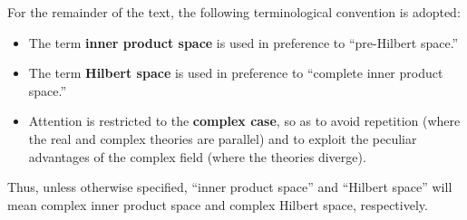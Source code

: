 For the remainder of the text, the following terminological convention is adopted:

\begin{itemize}
\item The term \textbf{inner product space} is used in preference to ``pre-Hilbert space.''
\item The term \textbf{Hilbert space} is used in preference to ``complete inner product space.''
\item Attention is restricted to the \textbf{complex case}, so as to avoid repetition (where the real and complex theories are parallel) and to exploit the peculiar advantages of the complex field (where the theories diverge).
\end{itemize}

Thus, unless otherwise specified, ``inner product space'' and ``Hilbert space'' will mean complex inner product space and complex Hilbert space, respectively.

